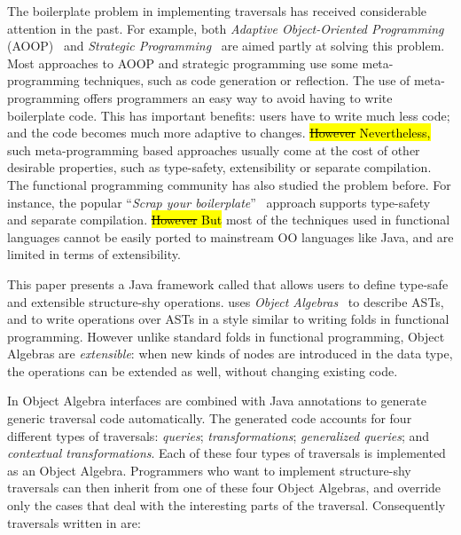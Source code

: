 The boilerplate problem in implementing traversals has received
considerable attention in the past. For example, both \emph{Adaptive
  Object-Oriented Programming} (AOOP)~\cite{DemeterBook} and
\emph{Strategic Programming}~\cite{borovansky1996elan,visser1998core}
are aimed partly at solving this problem. Most approaches to AOOP and
strategic programming use some meta-programming techniques, such as
code generation or reflection. The use of meta-programming offers
programmers an easy way to avoid having to write boilerplate code.
This has important benefits: users have to write much less code; and
the code becomes much more adaptive to changes.
\hl{\sout{However} Nevertheless,} such meta-programming based approaches usually come at the cost of
other desirable properties, such as type-safety, extensibility or
separate compilation. The functional programming community has also
studied the problem before. For instance, the popular ``\emph{Scrap your
boilerplate}''~\cite{ralf03syb} approach supports type-safety and
separate compilation. \hl{\sout{However} But} most of the techniques used in
functional languages cannot be easily ported to mainstream OO
languages like Java, and are limited in terms of extensibility.



This paper presents a Java framework called \name that allows users to
define type-safe and extensible structure-shy operations. \name
uses \emph{Object Algebras}~\cite{bruno12oa} to describe ASTs, and to
write operations over ASTs in a style similar to writing folds in
functional programming. However unlike standard folds in
functional programming, Object Algebras are
\emph{extensible}: when new kinds of nodes are introduced in the data type, the operations can be extended as well, without changing existing code.

In \name Object Algebra interfaces are combined
with Java annotations to generate generic traversal code automatically. The
generated code accounts for four different types of traversals:
\emph{queries}; \emph{transformations}; \emph{generalized queries};
and \emph{contextual transformations}.  Each of these four types of
traversals is implemented as an Object Algebra. Programmers who want
to implement structure-shy traversals can then inherit from one of these
four Object Algebras, and override only the cases that deal with
the interesting parts of the traversal. Consequently
traversals written in \name are:

